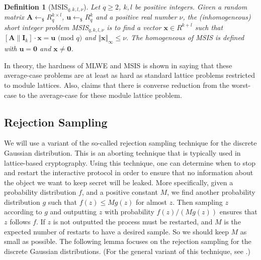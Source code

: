 \documentclass[conference]{IEEEtran}
\newtheorem{definition}{Definition}[section]
\begin{document}
	\begin{definition}[\textsf{MSIS$_{q,k,l, \nu}$}] \label{def1}
		Let $q \geq 2$, $k, l$ be positive integers. Given a random matrix $\mathbf{A} \leftarrow_{\$}  R_q^{k \times l}$, $\mathbf{u} \leftarrow_{\$} R_q^{k}$ and a positive real number $\nu$, the (inhomogeneous) short integer problem \textsf{MSIS$_{q,k,l, \nu}$} is to find a vector $\mathbf{x}\in R^{k+l}$ such that $[\mathbf{A}\|\mathbf{I}_k]\cdot \mathbf{x} =\mathbf{u} \text{ (mod } q)$ and $\Vert \mathbf{x}\Vert_{\infty} \leq \nu.$ The homogeneous of \textsf{MSIS} is defined with $\mathbf{u}=\mathbf{0}$ and $\mathbf{x}\neq \mathbf{0}$.
	\end{definition}
	
	In theory, the hardness of \textsf{MLWE} and \textsf{MSIS} is shown in \cite{LS15} saying that these average-case problems are at least as hard as standard lattice problems restricted to module lattices. Also, \cite{LS15} claims that there is converse reduction from the worst-case to the average-case for these module lattice problem. 
	\iffalse
	Also, in practice, we want to stress that, so far, the best known way to solving  Note that, we always can view any \textsf{MLWE$_{q,k,l,\chi}$} and and \textsf{MSIS$_{q,k,l,\nu}$}  as an $\textsf{LWE}_{q,nk,nl,\chi_{\mathbb{Z}}}$  instance and $\textsf{SIS}_{q,nk,nl,\nu}$ instance, respectively (see, e.g. \cite[Appendix C.2, C.3]{DKL+19}).  From such a perspective, it is well-khown that these two problems \textsf{dMLWE} and \textsf{sMLWE} are also equivalent in terms of the hardness as mentioned above.
	\fi
	\iffalse
	\subsection{Rejection Sampling} \label{resam}
	We will use a variant of the so-called rejection sampling technique  for the discrete Gaussian distribution. This is an aborting technique that is typically used in lattice-based cryptography. Using this technique, one can determine when to stop and restart the interactive protocol in order to ensure that no information about the object we want to keep secret will be leaked. More specifically,  given a probability distribution $f$, and a positive constant $M$, we find another probability distribution $g$ such that
	$f(z) \leq Mg(z)$ for almost $z$. Then sampling $z$ according to $g$ and outputting $z$ with probability $f(z)/ (Mg(z))$ ensures that $z$ follows $f$. If $z$ is not outputted the process must be restarted, and $M$ is the expected number of restarts to have a desired sample. So we should keep $M$ as small as possible. The following lemma focuses on the rejection sampling for the discrete Gaussian distributions. (For the general variant of this technique, see \cite[Lemma 4.7]{Lyu11}.)
	
\end{document}
